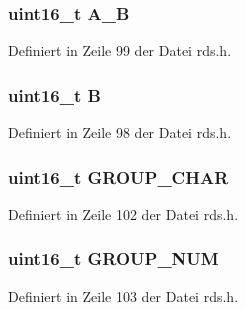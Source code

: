 \subsubsection[{A\+\_\+\+B}]{\setlength{\rightskip}{0pt plus 5cm}uint16\+\_\+t A\+\_\+\+B}\label{structgroup__2b_a226eb9a4ec1152d0c92ce7324916ad56}


Definiert in Zeile 99 der Datei rds.\+h.

\hypertarget{structgroup__2b_ae783bd90764c8455228772c025c064e4}{}
\subsubsection[{B}]{\setlength{\rightskip}{0pt plus 5cm}uint16\+\_\+t B}\label{structgroup__2b_ae783bd90764c8455228772c025c064e4}


Definiert in Zeile 98 der Datei rds.\+h.

\hypertarget{structgroup__2b_a66d4119990dc4c3e040a43885e9bb953}{}
\subsubsection[{G\+R\+O\+U\+P\+\_\+\+C\+H\+A\+R}]{\setlength{\rightskip}{0pt plus 5cm}uint16\+\_\+t G\+R\+O\+U\+P\+\_\+\+C\+H\+A\+R}\label{structgroup__2b_a66d4119990dc4c3e040a43885e9bb953}


Definiert in Zeile 102 der Datei rds.\+h.

\hypertarget{structgroup__2b_a9f692e9f76ee88348d426bcd4e9bc70b}{}
\subsubsection[{G\+R\+O\+U\+P\+\_\+\+N\+U\+M}]{\setlength{\rightskip}{0pt plus 5cm}uint16\+\_\+t G\+R\+O\+U\+P\+\_\+\+N\+U\+M}\label{structgroup__2b_a9f692e9f76ee88348d426bcd4e9bc70b}


Definiert in Zeile 103 der Datei rds.\+h.

\hypertarget{structgroup__2b_a5cd9b1f6413028425796c1129aa8fd87}{}
